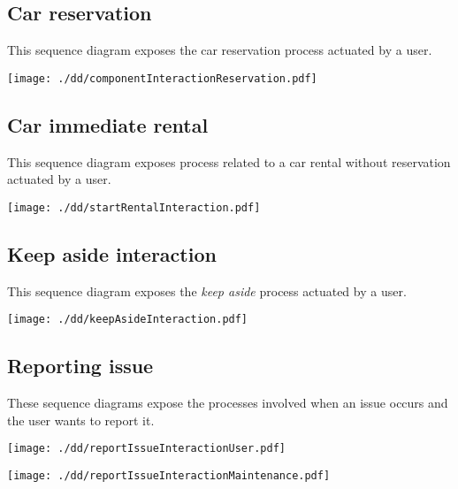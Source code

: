 \documentclass{scrreprt}
\begin{document}
\subsection{Car reservation}
This sequence diagram exposes the car reservation process actuated by a user.
\begin{center}
		\texttt{[image: ./dd/componentInteractionReservation.pdf]}
\end{center}

\subsection{Car immediate rental}
This sequence diagram exposes process related to a car rental without reservation actuated by a user.
\begin{center}
		\texttt{[image: ./dd/startRentalInteraction.pdf]}
\end{center}

\subsection{Keep aside interaction}
This sequence diagram exposes the \emph{keep aside} process actuated by a user.
\begin{center}
		\texttt{[image: ./dd/keepAsideInteraction.pdf]}
\end{center}

\subsection{Reporting issue}
These sequence diagrams expose the processes involved when an issue occurs and the user wants to report it.
\begin{center}
		\texttt{[image: ./dd/reportIssueInteractionUser.pdf]}
\end{center}
\begin{center}
		\texttt{[image: ./dd/reportIssueInteractionMaintenance.pdf]}
\end{center}
\newpage
\end{document}
